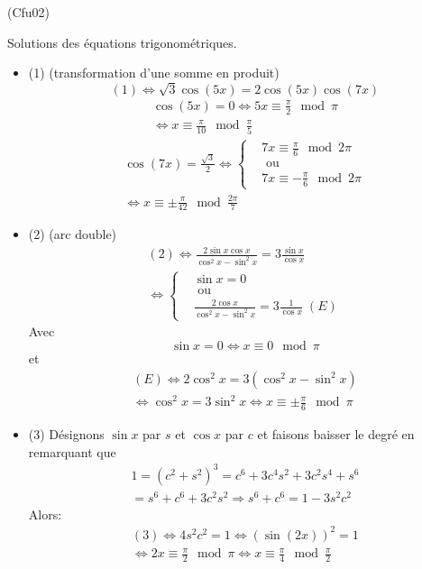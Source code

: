\begin{tiny}(Cfu02)\end{tiny} Solutions des équations trigonométriques.
\begin{itemize}
  \item (1) (transformation d'une somme en produit)
\begin{displaymath}
 (1) \Leftrightarrow \sqrt{3}\cos(5x) = 2\cos(5x)\cos(7x) 
\end{displaymath}
\begin{multline*}
\cos(5x)=0\Leftrightarrow 5x\equiv \frac{\pi}{2}\mod \pi\\
\Leftrightarrow x\equiv \frac{\pi}{10}\mod \frac{\pi}{5}
\end{multline*}
\begin{multline*}
\cos(7x)=\frac{\sqrt{3}}{2}\Leftrightarrow
\left\lbrace 
\begin{aligned}
&7x\equiv \frac{\pi}{6}\mod 2\pi \\ &\text{ ou } \\ &7x\equiv -\frac{\pi}{6}\mod 2\pi   
\end{aligned}
\right. \\
\Leftrightarrow x\equiv \pm\frac{\pi}{42}\mod \frac{2\pi}{7}
\end{multline*}

  \item (2) (arc double)
\begin{multline*}
(2)\Leftrightarrow \frac{2\sin x \cos x}{\cos^2x - \sin^2 x}= 3\frac{\sin x}{\cos x} \\
\Leftrightarrow
\left\lbrace 
\begin{aligned}
&\sin x = 0 \\ &\text{ ou }\\
 &\frac{2\cos x}{\cos^2x - \sin^2 x}= 3\frac{1}{\cos x} \;(E)
\end{aligned}
\right. 
\end{multline*}
Avec
\begin{displaymath}
\sin x = 0 \Leftrightarrow x\equiv 0 \mod \pi  
\end{displaymath}
et
\begin{multline*}
(E) \Leftrightarrow 2\cos^2 x = 3(\cos^2x -\sin^2 x) \\
\Leftrightarrow \cos^2 x = 3\sin^2 x 
\Leftrightarrow x \equiv \pm \frac{\pi}{6} \mod \pi
\end{multline*} 

  \item (3) Désignons $\sin x$ par $s$ et $\cos x$ par $c$ et faisons baisser le degré en remarquant que
\begin{multline*}
1 =(c^2+s^2)^3 = c^6+3c^4s^2+3c^2s^4+s^6 \\
=s^6+c^6+3c^2s^2
\Rightarrow 
s^6+c^6 = 1-3s^2c^2
\end{multline*}
Alors:
\begin{multline*}
(3) \Leftrightarrow 4s^2c^2 =1 
\Leftrightarrow (\sin(2x))^2 = 1 \\
\Leftrightarrow 2x \equiv \frac{\pi}{2}\mod \pi 
\Leftrightarrow x \equiv \frac{\pi}{4}\mod \frac{\pi}{2}
\end{multline*}


\end{itemize}
